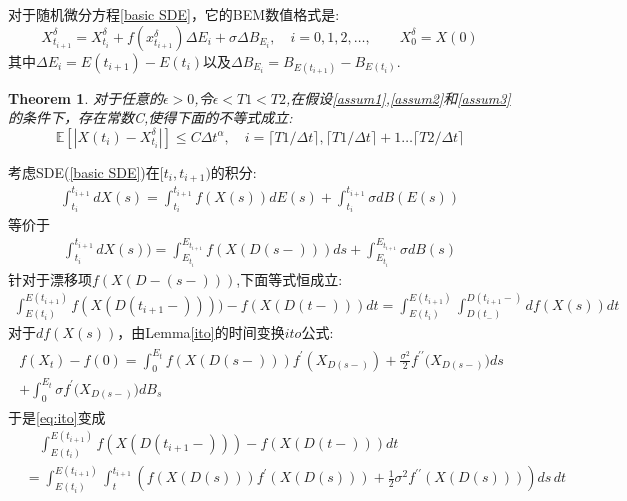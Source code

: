 \documentclass[12pt,final]{article}
\makeatletter
\numberwithin{equation}{section}
\numberwithin{figure}{section}
\numberwithin{table}{section}
\theoremstyle{plain}
\renewcommand{\proofname}{proof}
\newtheorem{theorem}{Theorem}[section]   %
\theoremstyle{definition}
\theoremstyle{remark}
\renewenvironment{proof}[1][\proofname]{\par
  \pushQED{\qed}%
  \normalfont \topsep6\p@\@plus6\p@\relax
  \trivlist\item[\hskip\labelsep
  \bfseries #1\@addpunct{\,:\,}]\ignorespaces
}{%
  \popQED\endtrivlist\@endpefalse
}
\makeatother
\begin{document}
对于随机微分方程\eqref{basic SDE}，它的BEM数值格式是:
\begin{equation}\label{eq:1}
	X_{t_{i+1}}^{\delta}=X_{t_i}^{\delta}+f(x_{t_{i+1}}^{\delta})\Delta E_{i}+\sigma\Delta B_{E_{i}},\quad i=0,1,2,\ldots,\qquad X_0^\delta=X(0)
\end{equation}
其中$\Delta E_{i}=E(t_{i+1})-E(t_i)$以及$\Delta B_{E_{i}}=B_{E{(t_{i+1})}}-B_{E({t_i})}$.
\begin{theorem}\label{main th}
	对于任意的$\epsilon>0$,令$\epsilon < T1 < T2$,在假设\ref{assum1},\ref{assum2}和\ref{assum3}的条件下，存在常数C,使得下面的不等式成立:
		$$\mathbb{E}[|X({t_i})-X_{t_i}^{\delta}|]\le C\Delta t^\alpha,\quad i=\lceil T1/\Delta t \rceil,\lceil T1/\Delta t \rceil+1 \ldots \lceil T2/\Delta t \rceil$$
\end{theorem}
\begin{proof}
考虑SDE(\ref{basic SDE})在$[t_i,t_{i+1})$的积分:
\begin{align}
	\int_{t_i}^{t_{i+1}}dX(s)=\int_{t_i}^{t_{i+1}}f(X(s))dE(s)+\int_{t_i}^{t_{i+1}}\sigma dB(E(s))
\end{align}
等价于
\begin{align}
	\int_{t_i}^{t_{i+1}}dX(s))=\int_{E_{t_i}}^{E_{t_{i+1}}}f(X(D(s-)))ds+\int_{E_{t_i}}^{E_{t_{i+1}}}\sigma dB(s)
\end{align}
针对于漂移项$f(X(D-(s-)))$,下面等式恒成立:
\begin{align}\label{eq:ito}
	\int_{E(t_i)}^{E(t_{i+1})} f(X(D(t_{i+1}-)))) - f(X(D(t-))) dt = \int_{E(t_i)}^{E(t_{i+1})} \int^{D(t_{i+1}-)}_{D(t_-)} df(X(s)) dt
\end{align}
对于$df(X(s))$，由Lemma\ref{ito}的时间变换$ito$公式:
\begin{align*}
	\begin{gathered}
		f(X_{t})-f(0)=\int_{0}^{E_{t}}f(X(D(s-)))f^{\prime}\left(X_{D(s-)}\right)+\frac{\sigma^{2}}{2}f^{\prime\prime}\big(X_{D(s-)}\big)ds \\
		+\int_{0}^{E_{t}}\sigma f^{\prime}\big(X_{D(s-)}\big)dB_{s}
	\end{gathered}
\end{align*}
于是\eqref{eq:ito}变成
\begin{equation}\label{eq:ito1}
	\begin{aligned}
		&\quad\int_{E(t_i)}^{E(t_{i+1})} f(X(D(t_{i+1}-))) - f(X(D(t-))) dt \\
		&= \int_{E(t_i)}^{E(t_{i+1})} \int_{t}^{t_{i+1}} \left( f(X(D(s))) f^{\prime}(X(D(s))) + \frac{1}{2} \sigma^2 f^{\prime\prime}(X(D(s))) \right) ds \, dt\\

\end{aligned}
\end{equation}
\end{proof}
\end{document}
